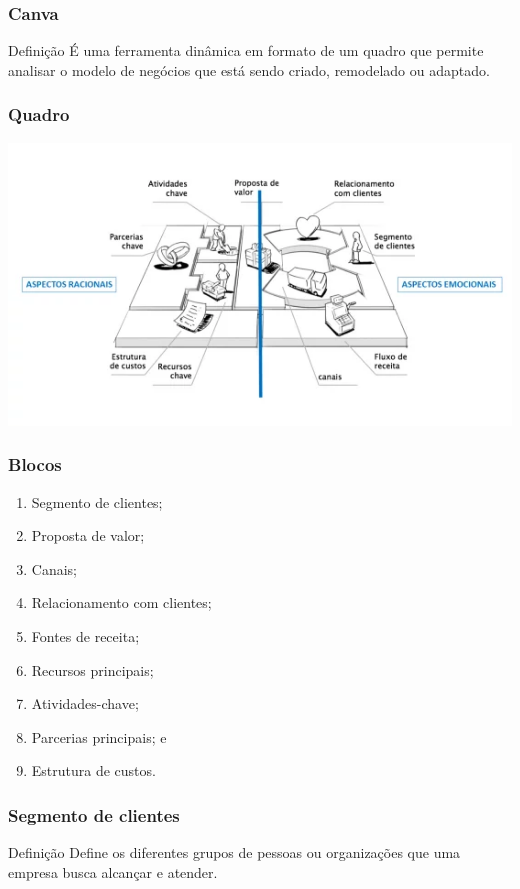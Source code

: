 \documentclass[aspectratio=169]{beamer}
\begin{document}
\begin{frame}
	\frametitle{Canva}

	\begin{block}{Defini\c cão}
		É uma ferramenta dinâmica em formato de um quadro que permite analisar o modelo de negócios que está sendo criado, remodelado ou adaptado.
	\end{block}
\end{frame}

\begin{frame}
	\frametitle{Quadro}
	
	\begin{center}
			\includegraphics[scale=0.7]{img/canva}
	\end{center}
\end{frame}

\begin{frame}
	\frametitle{Blocos}

	\begin{enumerate}
		\item Segmento de clientes;
		\item Proposta de valor;
		\item Canais;
		\item Relacionamento com clientes;
		\item Fontes de receita;
		\item Recursos principais;
		\item Atividades-chave;
		\item Parcerias principais; e
		\item Estrutura de custos.
	\end{enumerate}
\end{frame}

\begin{frame}
	\frametitle{Segmento de clientes}

	\begin{block}{Defini\c cão}
		 Define os diferentes grupos de pessoas ou organizações que uma empresa busca alcançar e atender.
	\end{block}
\end{frame}
\end{document}
